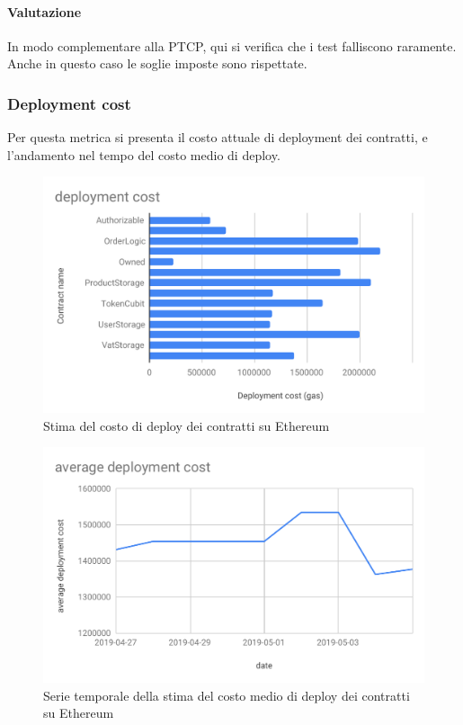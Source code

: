 \paragraph*{Valutazione}
In modo complementare alla PTCP, qui si verifica che i test falliscono raramente. Anche in questo caso le soglie imposte sono rispettate.


\subsubsection{Deployment cost}
Per questa metrica si presenta il costo attuale di deployment dei contratti, e l'andamento nel tempo del costo medio di deploy.
\begin{figure}[H]
	\centering
	\includegraphics[scale=0.6]{res/images/RA/deployment-cost.pdf}
	\caption{Stima del costo di deploy dei contratti su Ethereum}
\end{figure}
\begin{figure}[H]
	\centering
	\includegraphics[scale=0.6]{res/images/RA/average-deployment-cost.pdf}
	\caption{Serie temporale della stima del costo medio di deploy dei contratti su Ethereum}
\end{figure}
